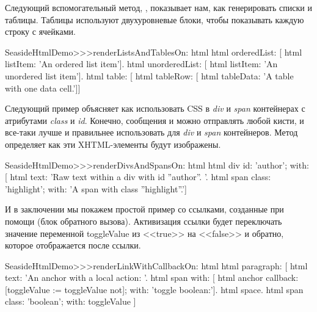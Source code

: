 \documentclass[a4paper,10pt,twoside]{book}
\begin{document}
Следующий вспомогательный метод,
,
показывает нам, как генерировать списки и таблицы.
Таблицы используют двухуровневые блоки,
чтобы показывать каждую строку с ячейками.

\begin{code}{}
SeasideHtmlDemo>>>renderListsAndTablesOn: html 
	html orderedList: [
		html listItem: 'An ordered list item'].
	html unorderedList: [
		html listItem: 'An unordered list item'].
	html table: [
		html tableRow: [
			html tableData: 'A table with one data cell.']]
\end{code}


Следующий пример объясняет как использовать CSS в \emph{div} и
\emph{span} контейнерах с атрибутами \emph{class} и \emph{id}.
Конечно, сообщения  и  можно отправлять любой кисти,
и все-таки лучше и правильнее использовать
для \emph{div} и \emph{span} контейнеров.
Метод  определяет как эти XHTML-элементы
будут изображены.

\begin{code}{}
SeasideHtmlDemo>>>renderDivsAndSpansOn: html 
	html div
		id: 'author';
		with: [
			html text: 'Raw text within a div with id ''author''. '.
			html span
				class: 'highlight';
				with: 'A span with class ''highlight''.']
\end{code}


И в заключении мы покажем простой пример со ссылками,
созданные при помощи  (блок обратного вызова).
Активизация ссылки будет переключать значение переменной toggleValue
из <<true>> на <<false>> и обратно, которое отображается после ссылки.

\begin{code}{}
SeasideHtmlDemo>>>renderLinkWithCallbackOn: html 
	html paragraph: [
		html text: 'An anchor with a local action: '.
		html span with: [
			html anchor
				callback: [toggleValue := toggleValue not];
				with: 'toggle boolean:'].
		html space.
		html span
			class: 'boolean';
			with: toggleValue ]
\end{code}
\end{document}
